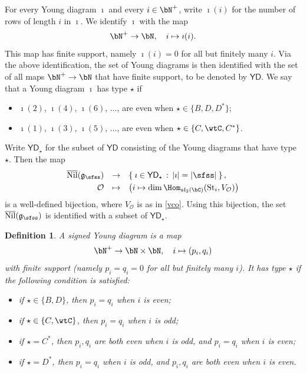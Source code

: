 \documentclass[11pt,a4paper]{amsart}
\def\YD{{\mathsf{YD}}}
\def\abs#1{\left|{#1}\right|}
\def\fsl{\mathfrak{sl}}
\newcommand{\CO}{{\mathcal {O}}}
\newcommand{\slt}{\operatorname{SL}_2(\mathbb{R})}
\newcommand{\g}{\mathfrak g}
\numberwithin{equation}{section}
\newtheorem{defn}[thm]{Definition}
\theoremstyle{remark}
\def\slt{\fsl_2(\bC)}
\def\Nil{\overline{\mathrm{Nil}}}
\def\YD{{\mathsf{YD}}}
\def\St#1{\mathrm{St}_{#1}}
\begin{document}
For every Young diagram $\imath$ and every $i\in \bN^+$, write $\imath(i)$ for the number of rows of length $i$ in $\imath$.  We identify $\imath$ with the map
\[
  \bN^+\rightarrow \bN, \quad i\mapsto \imath(i).
\]
This map has  finite support, namely $\imath(i)=0$ for all but finitely many $i$. Via the above identification, the set of Young diagrams is then identified with the set of all maps $\bN^+\rightarrow \bN$
that have finite support, to be denoted by $\YD$.
We say that a Young diagram $\imath$ has type $\star$ if
\begin{itemize}
    \item $\imath(2)$, $\imath(4)$, $\imath(6)$, $\dots$, are even when $\star\in \{B,D, D^*\}$;
    \item $\imath(1)$, $\imath(3)$, $\imath(5)$, $\dots$, are even when $\star\in \{C,\wtC, C^*\}$.
\end{itemize}
Write $\YD_\star$ for the subset of $\YD$ consisting of the Young diagrams that have type $\star$. Then the map
\begin{equation}\label{YDO}
  \begin{array}{rcl}
  \Nil(\g_{\sfss})&\rightarrow& \Set{\imath\in \YD_\star \,:\,  \abs{\imath}=\abs{\sfss}}, \smallskip\\
  \CO&\mapsto& \left(i\mapsto \dim \Hom_{\slt}(\St{i}, V_\CO)\right)
  \end{array}
\end{equation}
is a well-defined bijection, where $V_\CO$ is as in \eqref{vco}. Using this bijection, the set $\Nil(\g_{\sfss})$ is  identified with a subset of $\YD_\star$.

\begin{defn}
 A signed Young diagram  is a map
 \[
 \bN^+\rightarrow \bN\times \bN,\quad i\mapsto (p_i,q_i)
 \]
 with finite support (namely $p_i=q_i=0$ for all but finitely many $i$). It has  type $\star$ if the following condition is satisfied:
 \begin{itemize}
     \item if $\star\in\{B,D\}$, then $p_i=q_i$ when $i$ is even;
     \item if $\star\in\{C,\wtC\}$, then $p_i=q_i$ when $i$ is odd;
     \item if $\star=C^*$, then $p_i, q_i$ are both even when $i$ is odd, and $p_i= q_i$  when $i$ is even;
     \item if $\star=D^*$, then  $p_i= q_i$  when $i$ is odd, and $p_i, q_i$ are both even when $i$ is even.
 \end{itemize}
\end{defn}
\end{document}
